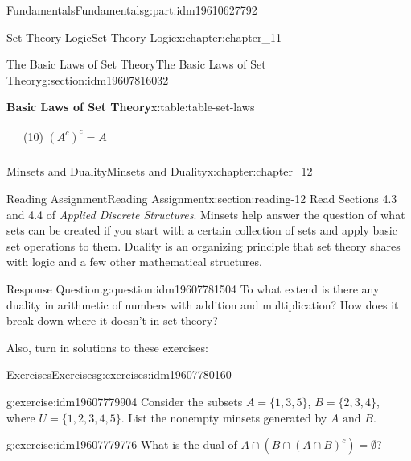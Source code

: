 \documentclass[oneside,10pt,]{book}
\numberwithin{equation}{section}
\newcommand{\hrulethin}  {\noalign{\hrule height 0.04em}}
\begin{document}
\begin{partptx}{Fundamentals}{}{Fundamentals}{}{}{g:part:idm19610627792}
\begin{chapterptx}{Set Theory Logic}{}{Set Theory Logic}{}{}{x:chapter:chapter_11}
\begin{sectionptx}{The Basic Laws of Set Theory}{}{The Basic Laws of Set Theory}{}{}{g:section:idm19607816032}
\begin{tableptx}{\textbf{Basic Laws of Set Theory}}{x:table:table-set-laws}{}
{\begin{tabular}{ccc}
&(10) \((A^c)^c= A\)&\tabularnewline\hrulethin
\end{tabular}
}%
\end{tableptx}%
\end{sectionptx}
\end{chapterptx}
%
\typeout{************************************************}
\typeout{************************************************}
%
\begin{chapterptx}{Minsets and Duality}{}{Minsets and Duality}{}{}{x:chapter:chapter_12}
\index{}%
%
%
\typeout{************************************************}
\typeout{************************************************}
%
\begin{sectionptx}{Reading Assignment}{}{Reading Assignment}{}{}{x:section:reading-12}
Read Sections 4.3 and 4.4 of \emph{Applied Discrete Structures}. Minsets help answer the question of what sets can be created if you start with a certain collection of sets and apply basic set operations to them.   Duality is an organizing principle that set theory shares with logic and a few other mathematical structures.%
\begin{question}{Response Question.}{g:question:idm19607781504}%
To what extend is there any duality in arithmetic of numbers with addition and multiplication?  How does it break down where it doesn't in set theory?%
\end{question}
Also, turn in solutions to these exercises:%
%
%
\typeout{************************************************}
\typeout{************************************************}
%
\begin{exercises-subsection-numberless}{Exercises}{}{Exercises}{}{}{g:exercises:idm19607780160}
\par\medskip\noindent%
%
\begin{exercisegroup}
\begin{divisionexerciseeg}{1}{}{}{g:exercise:idm19607779904}%
Consider the subsets \(A = \{1, 3, 5\}\), \(B = \{2,3,4\}\),  where \(U = \{1,2,3,4,5\}\).  List the nonempty minsets generated by \(A\textrm{ and }B\).%
\end{divisionexerciseeg}%
\begin{divisionexerciseeg}{2}{}{}{g:exercise:idm19607779776}%
What is the dual of \(A \cap (B\cap (A\cap B)^c)= \emptyset\)?%
\end{divisionexerciseeg}%
\end{exercisegroup}
\par\medskip\noindent

\end{exercises-subsection-numberless}
\end{sectionptx}
\end{chapterptx}
\end{partptx}
\end{document}
